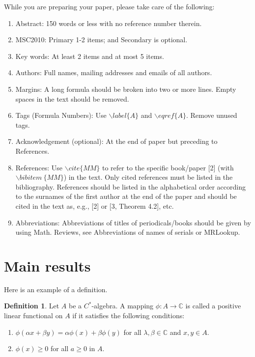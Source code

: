 \documentclass[12pt, reqno]{amsart}
\theoremstyle{definition}
\newtheorem{definition}[theorem]{Definition}
\theoremstyle{remark}
\numberwithin{equation}{section}
\begin{document}
While you are preparing your paper, please take care of the
following:
\begin{enumerate}
\item Abstract: 150 words or less with no reference number therein.\\
\item MSC2010: Primary 1-2 items; and Secondary is optional.\\

\item Key words: At least 2 items and at most 5 items.\\
\item Authors: Full names, mailing addresses and emails of all authors.\\
\item Margins: A long formula should be broken into two or more lines. Empty spaces in the text should be removed.\\
\item Tags (Formula Numbers): Use $\backslash label\{A\}$ and $\backslash eqref\{A\}$. Remove unused tags. \\
\item Acknowledgement (optional): At the end of paper but preceding to References.\\
\item References: Use $\backslash cite\{MM\}$ to refer to the specific book/paper [2] (with $\backslash bibitem~\{MM\}$) in the text. Only cited references must be listed in the bibliography. References should be listed in the alphabetical order according to the surnames of the first author at the end of the paper and should be cited in the text as, e.g., [2] or [3, Theorem 4.2], etc.\\
\item Abbreviations: Abbreviations of titles of periodicals/books should be given by using Math. Reviews, see Abbreviations of names of serials or MRLookup.

\end{enumerate}

\section{Main results}

Here is an example of a definition. 

\begin{definition} Let $A$ be a $C^*$-algebra. A mapping
$\phi :A\rightarrow \mathbb{C} $ is
called a positive linear functional on $A$ if it satisfies the following conditions:

\begin{enumerate}

\item $\phi(\alpha x+\beta y)=\alpha \phi(x)+\beta\phi(y)$ for all $\lambda ,\beta \in  \mathbb{C}$ and $x,y\in A$.

\item $\phi(x)\geq 0$ for all $a\geq 0$ in $A$.
\end{enumerate}
\end{definition}
\end{document}
